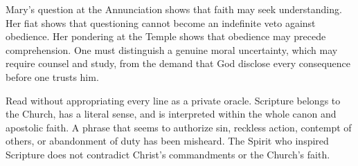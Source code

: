 Mary's question at the Annunciation shows that faith may seek understanding. Her fiat shows that questioning cannot become an indefinite veto against obedience. Her pondering at the Temple shows that obedience may precede comprehension. One must distinguish a genuine moral uncertainty, which may require counsel and study, from the demand that God disclose every consequence before one trusts him.

Read without appropriating every line as a private oracle. Scripture belongs to the Church, has a literal sense, and is interpreted within the whole canon and apostolic faith. A phrase that seems to authorize sin, reckless action, contempt of others, or abandonment of duty has been misheard. The Spirit who inspired Scripture does not contradict Christ's commandments or the Church's faith.




